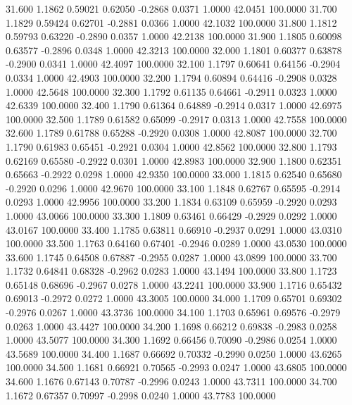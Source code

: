   31.600   1.1862   0.59021   0.62050  -0.2868   0.0371   1.0000  42.0451 100.0000
  31.700   1.1829   0.59424   0.62701  -0.2881   0.0366   1.0000  42.1032 100.0000
  31.800   1.1812   0.59793   0.63220  -0.2890   0.0357   1.0000  42.2138 100.0000
  31.900   1.1805   0.60098   0.63577  -0.2896   0.0348   1.0000  42.3213 100.0000
  32.000   1.1801   0.60377   0.63878  -0.2900   0.0341   1.0000  42.4097 100.0000
  32.100   1.1797   0.60641   0.64156  -0.2904   0.0334   1.0000  42.4903 100.0000
  32.200   1.1794   0.60894   0.64416  -0.2908   0.0328   1.0000  42.5648 100.0000
  32.300   1.1792   0.61135   0.64661  -0.2911   0.0323   1.0000  42.6339 100.0000
  32.400   1.1790   0.61364   0.64889  -0.2914   0.0317   1.0000  42.6975 100.0000
  32.500   1.1789   0.61582   0.65099  -0.2917   0.0313   1.0000  42.7558 100.0000
  32.600   1.1789   0.61788   0.65288  -0.2920   0.0308   1.0000  42.8087 100.0000
  32.700   1.1790   0.61983   0.65451  -0.2921   0.0304   1.0000  42.8562 100.0000
  32.800   1.1793   0.62169   0.65580  -0.2922   0.0301   1.0000  42.8983 100.0000
  32.900   1.1800   0.62351   0.65663  -0.2922   0.0298   1.0000  42.9350 100.0000
  33.000   1.1815   0.62540   0.65680  -0.2920   0.0296   1.0000  42.9670 100.0000
  33.100   1.1848   0.62767   0.65595  -0.2914   0.0293   1.0000  42.9956 100.0000
  33.200   1.1834   0.63109   0.65959  -0.2920   0.0293   1.0000  43.0066 100.0000
  33.300   1.1809   0.63461   0.66429  -0.2929   0.0292   1.0000  43.0167 100.0000
  33.400   1.1785   0.63811   0.66910  -0.2937   0.0291   1.0000  43.0310 100.0000
  33.500   1.1763   0.64160   0.67401  -0.2946   0.0289   1.0000  43.0530 100.0000
  33.600   1.1745   0.64508   0.67887  -0.2955   0.0287   1.0000  43.0899 100.0000
  33.700   1.1732   0.64841   0.68328  -0.2962   0.0283   1.0000  43.1494 100.0000
  33.800   1.1723   0.65148   0.68696  -0.2967   0.0278   1.0000  43.2241 100.0000
  33.900   1.1716   0.65432   0.69013  -0.2972   0.0272   1.0000  43.3005 100.0000
  34.000   1.1709   0.65701   0.69302  -0.2976   0.0267   1.0000  43.3736 100.0000
  34.100   1.1703   0.65961   0.69576  -0.2979   0.0263   1.0000  43.4427 100.0000
  34.200   1.1698   0.66212   0.69838  -0.2983   0.0258   1.0000  43.5077 100.0000
  34.300   1.1692   0.66456   0.70090  -0.2986   0.0254   1.0000  43.5689 100.0000
  34.400   1.1687   0.66692   0.70332  -0.2990   0.0250   1.0000  43.6265 100.0000
  34.500   1.1681   0.66921   0.70565  -0.2993   0.0247   1.0000  43.6805 100.0000
  34.600   1.1676   0.67143   0.70787  -0.2996   0.0243   1.0000  43.7311 100.0000
  34.700   1.1672   0.67357   0.70997  -0.2998   0.0240   1.0000  43.7783 100.0000
